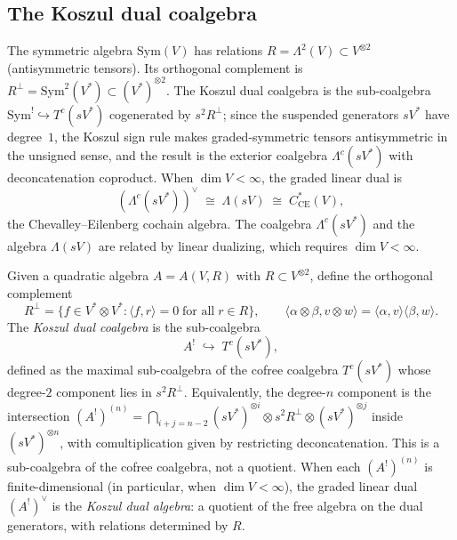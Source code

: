 \subsection{The Koszul dual coalgebra}

\begin{example}\label{ex:com-lie-koszul-coalgebra}
The symmetric algebra $\mathrm{Sym}(V)$ has relations
$R = \Lambda^2(V) \subset V^{\otimes 2}$ (antisymmetric tensors).
Its orthogonal complement is
$R^\perp = \mathrm{Sym}^2(V^*) \subset (V^*)^{\otimes 2}$.
The Koszul dual coalgebra is the sub-coalgebra
$\mathrm{Sym}^! \hookrightarrow T^c(sV^*)$
cogenerated by $s^2 R^\perp$; since the suspended generators $sV^*$
have degree~$1$, the Koszul sign rule makes graded-symmetric tensors
antisymmetric in the unsigned sense, and the result is the exterior
coalgebra $\Lambda^c(sV^*)$ with deconcatenation coproduct.
When $\dim V < \infty$, the graded linear dual is
\[
(\Lambda^c(sV^*))^{\vee} \;\cong\; \Lambda(sV)
\;\cong\; C^*_{\mathrm{CE}}(V),
\]
the Chevalley--Eilenberg cochain algebra.
The coalgebra $\Lambda^c(sV^*)$ and the algebra $\Lambda(sV)$
are related by linear dualizing, which requires
$\dim V < \infty$.
\end{example}

\begin{construction}
\label{const:quadratic-dual}
Given a quadratic algebra $A = A(V,R)$ with $R \subset V^{\otimes 2}$,
define the orthogonal complement
\[
R^\perp = \{f \in V^* \otimes V^* :
\langle f, r \rangle = 0 \;\text{for all}\; r \in R\},
\qquad
\langle \alpha \otimes \beta, v \otimes w \rangle
= \langle \alpha, v \rangle \langle \beta, w \rangle.
\]
The \emph{Koszul dual coalgebra} is the sub-coalgebra
\[
A^! \;\hookrightarrow\; T^c(sV^*),
\]
defined as the maximal sub-coalgebra of the cofree coalgebra
$T^c(sV^*)$ whose degree-$2$ component lies in $s^2 R^\perp$.
Equivalently, the degree-$n$ component is the intersection
$(A^!)^{(n)} = \bigcap_{i+j=n-2}
(sV^*)^{\otimes i} \otimes s^2 R^\perp \otimes (sV^*)^{\otimes j}$
inside $(sV^*)^{\otimes n}$, with comultiplication given by
restricting deconcatenation.
This is a sub-coalgebra of the cofree coalgebra, not a quotient.
When each $(A^!)^{(n)}$ is finite-dimensional (in particular, when
$\dim V < \infty$), the graded linear dual $(A^!)^{\vee}$ is
the \emph{Koszul dual algebra}: a quotient of the free algebra
on the dual generators, with relations determined by $R$.
\end{construction}

